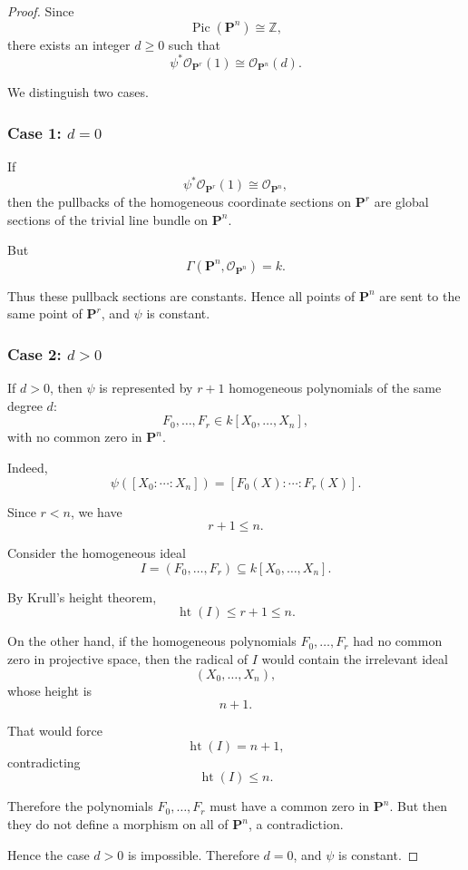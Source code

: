 \begin{proof}
	Since
	\[
	\operatorname{Pic}(\mathbf{P}^n)\cong \mathbb{Z},
	\]
	there exists an integer \(d\geq 0\) such that
	\[
	\psi^*\mathcal{O}_{\mathbf{P}^r}(1)\cong \mathcal{O}_{\mathbf{P}^n}(d).
	\]
	
	We distinguish two cases.
	
	\subsubsection*{Case 1: \(d=0\)}
	
	If
	\[
	\psi^*\mathcal{O}_{\mathbf{P}^r}(1)\cong \mathcal{O}_{\mathbf{P}^n},
	\]
	then the pullbacks of the homogeneous coordinate sections on \(\mathbf{P}^r\) are global sections of the trivial line bundle on \(\mathbf{P}^n\).
	
	But
	\[
	\Gamma(\mathbf{P}^n,\mathcal{O}_{\mathbf{P}^n})=k.
	\]
	
	Thus these pullback sections are constants. Hence all points of \(\mathbf{P}^n\) are sent to the same point of \(\mathbf{P}^r\), and \(\psi\) is constant.
	
	\subsubsection*{Case 2: \(d>0\)}
	
	If \(d>0\), then \(\psi\) is represented by \(r+1\) homogeneous polynomials of the same degree \(d\):
	\[
	F_0,\dots,F_r\in k[X_0,\dots,X_n],
	\]
	with no common zero in \(\mathbf{P}^n\).
	
	Indeed,
	\[
	\psi([X_0:\cdots:X_n])
	=
	[F_0(X):\cdots:F_r(X)].
	\]
	
	Since \(r<n\), we have
	\[
	r+1\leq n.
	\]
	
	Consider the homogeneous ideal
	\[
	I=(F_0,\dots,F_r)\subseteq k[X_0,\dots,X_n].
	\]
	
	By Krull's height theorem,
	\[
	\operatorname{ht}(I)\leq r+1\leq n.
	\]
	
	On the other hand, if the homogeneous polynomials \(F_0,\dots,F_r\) had no common zero in projective space, then the radical of \(I\) would contain the irrelevant ideal
	\[
	(X_0,\dots,X_n),
	\]
	whose height is
	\[
	n+1.
	\]
	
	That would force
	\[
	\operatorname{ht}(I)=n+1,
	\]
	contradicting
	\[
	\operatorname{ht}(I)\leq n.
	\]
	
	Therefore the polynomials \(F_0,\dots,F_r\) must have a common zero in \(\mathbf{P}^n\). But then they do not define a morphism on all of \(\mathbf{P}^n\), a contradiction.
	
	Hence the case \(d>0\) is impossible. Therefore \(d=0\), and \(\psi\) is constant.
\end{proof}

